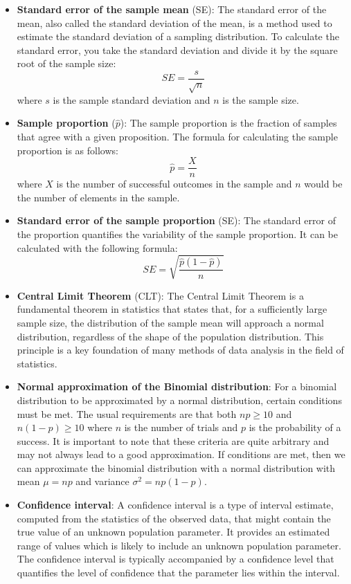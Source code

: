 \documentclass{article}
\begin{document}
\begin{itemize}
\item \textbf{Standard error of the sample mean} (SE): The standard error of the mean, also called the standard deviation of the mean, is a method used to estimate the standard deviation of a sampling distribution. To calculate the standard error, you take the standard deviation and divide it by the square root of the sample size:
\[ SE = \frac{s}{\sqrt{n}} \]  
where $s$ is the sample standard deviation and $n$ is the sample size.

\item \textbf{Sample proportion} ($\hat{p}$): The sample proportion is the fraction of samples that agree with a given proposition. The formula for calculating the sample proportion is as follows:
\[ \hat{p} = \frac{X}{n} \] 
where $X$ is the number of successful outcomes in the sample and $n$ would be the number of elements in the sample.

\item \textbf{Standard error of the sample proportion} (SE): The standard error of the proportion quantifies the variability of the sample proportion. It can be calculated with the following formula: 
\[ SE = \sqrt{\frac{\hat{p}(1-\hat{p})}{n}} \]

\item \textbf{Central Limit Theorem} (CLT): The Central Limit Theorem is a fundamental theorem in statistics that states that, for a sufficiently large sample size, the distribution of the sample mean will approach a normal distribution, regardless of the shape of the population distribution. This principle is a key foundation of many methods of data analysis in the field of statistics.

\item \textbf{Normal approximation of the Binomial distribution}: For a binomial distribution to be approximated by a normal distribution, certain conditions must be met. The usual requirements are that both $np \geq 10$ and $n(1 - p) \geq 10$ where $n$ is the number of trials and $p$ is the probability of a success. It is important to note that these criteria are quite arbitrary and may not always lead to a good approximation. If conditions are met, then we can approximate the binomial distribution with a normal distribution with mean $\mu = np$ and variance $\sigma^2 = np(1-p)$.

\item \textbf{Confidence interval}: A confidence interval is a type of interval estimate, computed from the statistics of the observed data, that might contain the true value of an unknown population parameter. It provides an estimated range of values which is likely to include an unknown population parameter. The confidence interval is typically accompanied by a confidence level that quantifies the level of confidence that the parameter lies within the interval.


\end{itemize}
\end{document}
